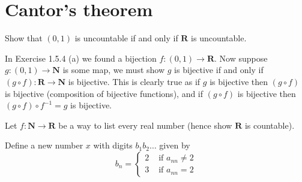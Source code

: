\section{Cantor's theorem}

\begin{exercise}
  Show that $(0,1)$ is uncountable if and only if $\mathbf{R}$ is uncountable.
\end{exercise}

\begin{solution}
  In Exercise 1.5.4 (a) we found a bijection $f : (0,1) \to \mathbf R$. Now suppose $g : (0,1) \to \mathbf N$ is some map, we must show $g$ is bijective if and only if $(g \circ f) : \mathbf R \to \mathbf N$ is bijective.
  This is clearly true as if $g$ is bijective then $(g \circ f)$ is bijective (composition of bijective functions), and if $(g \circ f)$ is bijective then $(g \circ f) \circ f^{-1} = g$ is bijective.
\end{solution}

\begin{exercise}
  Let $f : \mathbf{N} \to \mathbf{R}$ be a way to list every real number (hence show $\mathbf R$ is countable).

  Define a new number $x$ with digits $b_1b_2\ldots$ given by
  $$
  b_{n}= \begin{cases}2 & \text { if } a_{n n} \neq 2 \\ 3 & \text { if } a_{n n}=2\end{cases}
  $$

\end{exercise}



\begin{solution}
\end{solution}


